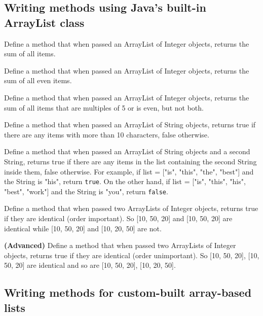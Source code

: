 \documentclass{exam}
\begin{document}
\subsection*{Writing methods using Java's built-in ArrayList class}
\begin{questions}
\question Define a method that when passed an ArrayList of Integer objects, returns the sum of all items.

\question Define a method that when passed an ArrayList of Integer objects, returns the sum of all even items.

\question Define a method that when passed an ArrayList of Integer objects, returns the sum of all items that are multiples of 5 or is even, but not both.

\question Define a method that when passed an ArrayList of String objects, returns true if there  are any items with more than 10 characters, false otherwise.

\question Define a method that when passed an ArrayList of String objects and a second String, returns true if there  are any items in the list containing the second String inside them, false otherwise. For example, if list = ["is", "this", "the", "best"] and the String is "his", return \texttt{true}. On the other hand, if list = ["is", "this", "his", "best", "work"] and the String is "you", return \texttt{false}.

\question Define a method that when passed two ArrayLists of Integer objects, returns true if they are identical (order important). So [10, 50, 20] and [10, 50, 20] are identical while [10, 50, 20] and [10, 20, 50] are not.

\question \textbf{(Advanced)} Define a method that when passed two ArrayLists of Integer objects, returns true if they are identical (order unimportant). So [10, 50, 20], [10, 50, 20] are identical and so are [10, 50, 20], [10, 20, 50].
\end{questions}

\subsection*{Writing methods for custom-built array-based lists}
\end{document}
